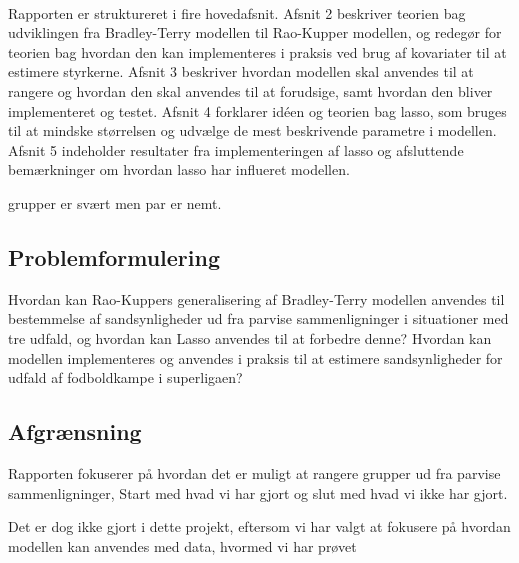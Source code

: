 \documentclass[11pt,a4paper]{article}
\begin{document}
 \\ \newline
Rapporten er struktureret i fire hovedafsnit. Afsnit 2 beskriver teorien bag udviklingen fra Bradley-Terry modellen til Rao-Kupper modellen, og redegør for teorien bag hvordan den kan implementeres i praksis ved brug af kovariater til at estimere styrkerne. Afsnit 3 beskriver hvordan modellen skal anvendes til at rangere og hvordan den skal anvendes til at forudsige, samt hvordan den bliver implementeret og testet. Afsnit 4 forklarer idéen og teorien bag lasso, som bruges til at mindske størrelsen og udvælge de mest beskrivende parametre i modellen. Afsnit 5 indeholder resultater fra implementeringen af lasso og afsluttende bemærkninger om hvordan lasso har influeret modellen.

grupper er svært men par er nemt. 
\subsection{Problemformulering}
Hvordan kan Rao-Kuppers generalisering af Bradley-Terry modellen anvendes til bestemmelse af sandsynligheder ud fra parvise sammenligninger i situationer med tre udfald, og hvordan kan Lasso anvendes til at forbedre denne? Hvordan kan modellen implementeres og anvendes i praksis til at estimere sandsynligheder for udfald af fodboldkampe i superligaen? 
\subsection{Afgrænsning}
Rapporten fokuserer på hvordan det er muligt at rangere grupper ud fra parvise sammenligninger, 
Start med hvad vi har gjort og slut med hvad vi ikke har gjort. 

Det er dog ikke gjort i dette projekt, eftersom vi har valgt at fokusere på hvordan modellen kan anvendes med data, hvormed vi har prøvet
\end{document}
